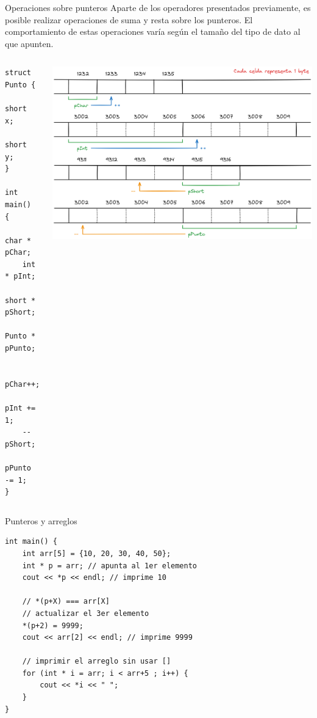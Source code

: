 \documentclass[12pt]{beamer}
\begin{document}
\begin{frame}[fragile]{Operaciones sobre punteros}
    Aparte de los operadores presentados previamente, es posible realizar operaciones de suma y resta sobre los punteros. 
    El comportamiento de estas operaciones varía según el \alert{tamaño del tipo de dato} al que apunten. \\
    \begin{columns}
        \begin{lstlisting}[basicstyle=\tiny]
struct Punto {
    short x;
    short y;
}

int main() {
    char * pChar;
    int * pInt;
    short * pShort;
    Punto * pPunto;
    
    pChar++;
    pInt += 1;
    --pShort;
    pPunto -= 1;
}
\end{lstlisting}
    \includegraphics[width=\textwidth]{punteros_suma_resta.png}
    \end{columns}
\end{frame}

\begin{frame}[fragile]{Punteros y arreglos}
\begin{lstlisting}
int main() {
	int arr[5] = {10, 20, 30, 40, 50};
	int * p = arr; // apunta al 1er elemento
	cout << *p << endl; // imprime 10
	
	// *(p+X) === arr[X]
	// actualizar el 3er elemento
	*(p+2) = 9999;
	cout << arr[2] << endl; // imprime 9999
	
	// imprimir el arreglo sin usar []
	for (int * i = arr; i < arr+5 ; i++) {
		cout << *i << " ";
	}
}        
\end{lstlisting}
\end{frame}
\end{document}

